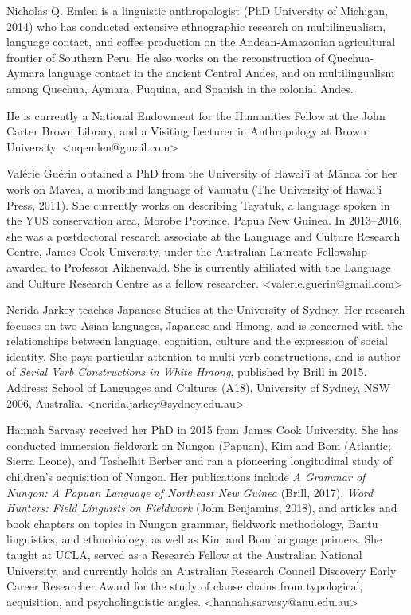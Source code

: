 \begin{refsection}
Nicholas Q. Emlen is a linguistic anthropologist (PhD University of Michigan, 2014) who has conducted extensive ethnographic research on multilingualism, language contact, and coffee production on the Andean-Amazonian agricultural frontier of Southern Peru. He also works on the reconstruction of Quechua-Aymara language contact in the ancient Central Andes, and on multilingualism among Quechua, Aymara, Puquina, and Spanish in the colonial Andes. 

\pagebreak
\noindent
He is currently a National Endowment for the Humanities Fellow at the John Carter Brown Library, and a Visiting Lecturer in Anthropology at Brown University. <nqemlen@gmail.com>

Valérie Guérin obtained a PhD from the University of Hawai'i at Mānoa for her work on Mavea, a moribund language of Vanuatu (The University of Hawai'i Press, 2011).  She currently works on describing Tayatuk, a language spoken in the YUS conservation area, Morobe Province, Papua New Guinea. In 2013--2016, she was a postdoctoral research associate at the Language and Culture Research Centre, James Cook University, under the Australian Laureate Fellowship awarded to Professor Aikhenvald. She is currently affiliated with the Language and Culture Research Centre as a fellow researcher. <valerie.guerin@gmail.com>

Nerida Jarkey teaches Japanese Studies at the University of Sydney. Her research focuses on two Asian languages, Japanese and Hmong, and is concerned with the relationships between language, cognition, culture and the expression of social identity. She pays particular attention to multi-verb constructions, and is author of \textit{Serial Verb Constructions in White Hmong}, published by Brill in 2015. Address: School of Languages and Cultures (A18), University of Sydney, NSW 2006, Australia. <nerida.jarkey@sydney.edu.au> 

Hannah Sarvasy received her PhD in 2015 from James Cook University. She has conducted immersion fieldwork on Nungon (Papuan), Kim and Bom (Atlantic; Sierra Leone), and Tashelhit Berber and ran a pioneering longitudinal study of children’s acquisition of Nungon. Her publications include \textit{A Grammar of Nungon: A Papuan Language of Northeast New Guinea} (Brill, 2017), \textit{Word Hunters: Field Linguists on Fieldwork} (John Benjamins, 2018), and articles and book chapters on topics in Nungon grammar, fieldwork methodology, Bantu linguistics, and ethnobiology, as well as Kim and Bom language primers. She taught at UCLA, served as a Research Fellow at the Australian National University, and currently holds an Australian Research Council Discovery Early Career Researcher Award for the study of clause chains from typological, acquisition, and psycholinguistic angles. <hannah.sarvasy@anu.edu.au>




\printbibliography[heading=subbibliography]
\end{refsection}